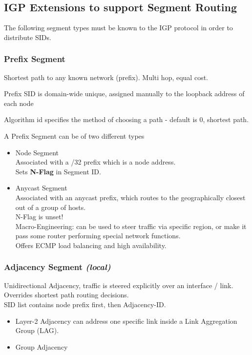 \subsection{IGP Extensions to support Segment Routing}
The following segment types must be known to the IGP protocol in order to distribute SIDs. 
\subsubsection{Prefix Segment}
Shortest path to any known network (prefix). Multi hop, equal cost.

\noindent
Prefix SID is domain-wide unique, assigned manually to the loopback address of each node

\noindent
Algorithm id specifies the method of choosing a path - default is 0, shortest path.

\noindent
A Prefix Segment can be of two different types
\begin{itemize}
    \item Node Segment \\
    Associated with a /32 prefix which is a node address. \\
    Sets \textbf{N-Flag} in Segment ID.
    \item Anycast Segment \\
    Associated with an anycast prefix, which routes to the geographically closest out of a group of hosts. \\
    N-Flag is unset! \\ 
    Macro-Engineering: can be used to steer traffic via specific region, or make it pass some router performing special network functions. \\
    Offers ECMP load balancing and high availability.
     
\end{itemize}
\subsubsection{Adjacency Segment \emph{(local)}}
Unidirectional Adjacency, traffic is steered explicitly over an interface / link. Overrides shortest path routing decisions. \\
SID list contains node prefix first, then Adjacency-ID. 
\begin{itemize}
    \item Layer-2 Adjacency can address one specific link inside a Link Aggregation Group (LAG). 
    \item Group Adjacency
\end{itemize} 

